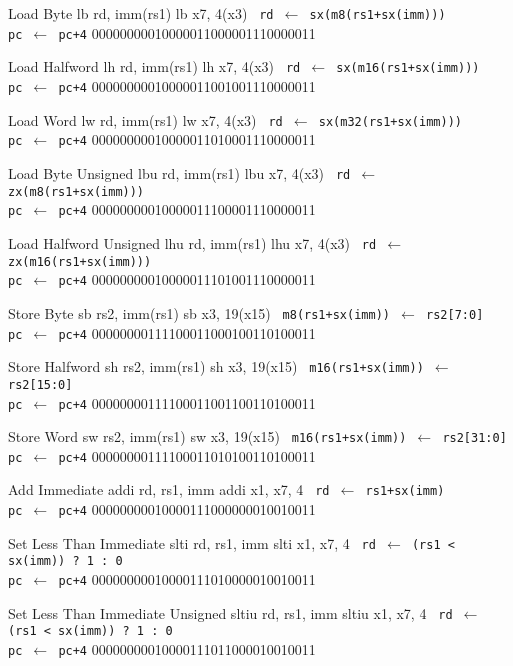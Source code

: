 \TDrawInsnTypeIPicture
{Load Byte}
{lb rd, imm(rs1)}
{lb x7, 4(x3)}
{\tt%
rd $\leftarrow$ sx(m8(rs1+sx(imm)))\\
pc $\leftarrow$ pc+4}
{00000000010000011000001110000011}

\TDrawInsnTypeIPicture
{Load Halfword}
{lh rd, imm(rs1)}
{lh x7, 4(x3)}
{\tt%
rd $\leftarrow$ sx(m16(rs1+sx(imm)))\\
pc $\leftarrow$ pc+4}
{00000000010000011001001110000011}

\TDrawInsnTypeIPicture
{Load Word}
{lw rd, imm(rs1)}
{lw x7, 4(x3)}
{\tt%
rd $\leftarrow$ sx(m32(rs1+sx(imm)))\\
pc $\leftarrow$ pc+4}
{00000000010000011010001110000011}

\TDrawInsnTypeIPicture
{Load Byte Unsigned}
{lbu rd, imm(rs1)}
{lbu x7, 4(x3)}
{\tt%
rd $\leftarrow$ zx(m8(rs1+sx(imm)))\\
pc $\leftarrow$ pc+4}
{00000000010000011100001110000011}

\TDrawInsnTypeIPicture
{Load Halfword Unsigned}
{lhu rd, imm(rs1)}
{lhu x7, 4(x3)}
{\tt%
rd $\leftarrow$ zx(m16(rs1+sx(imm)))\\
pc $\leftarrow$ pc+4}
{00000000010000011101001110000011}

\TDrawInsnTypeSPicture
{Store Byte}
{sb rs2, imm(rs1)}
{sb x3, 19(x15)}
{\tt%
m8(rs1+sx(imm)) $\leftarrow$ rs2[7:0]\\
pc $\leftarrow$ pc+4}
{00000000111100011000100110100011}

\TDrawInsnTypeSPicture
{Store Halfword}
{sh rs2, imm(rs1)}
{sh x3, 19(x15)}
{\tt%
m16(rs1+sx(imm)) $\leftarrow$ rs2[15:0]\\
pc $\leftarrow$ pc+4}
{00000000111100011001100110100011}

\TDrawInsnTypeSPicture
{Store Word}
{sw rs2, imm(rs1)}
{sw x3, 19(x15)}
{\tt%
m16(rs1+sx(imm)) $\leftarrow$ rs2[31:0]\\
pc $\leftarrow$ pc+4}
{00000000111100011010100110100011}

\TDrawInsnTypeIPicture
{Add Immediate}
{addi rd, rs1, imm}
{addi x1, x7, 4}
{\tt%
rd $\leftarrow$ rs1+sx(imm)\\
pc $\leftarrow$ pc+4}
{00000000010000111000000010010011}

\TDrawInsnTypeIPicture
{Set Less Than Immediate}
{slti rd, rs1, imm}
{slti x1, x7, 4}
{\tt%
rd $\leftarrow$ (rs1 < sx(imm)) ? 1 : 0\\
pc $\leftarrow$ pc+4}
{00000000010000111010000010010011}

\TDrawInsnTypeIPicture
{Set Less Than Immediate Unsigned}
{sltiu rd, rs1, imm}
{sltiu x1, x7, 4}
{\tt%
rd $\leftarrow$ (rs1 < sx(imm)) ? 1 : 0\\
pc $\leftarrow$ pc+4}
{00000000010000111011000010010011}

